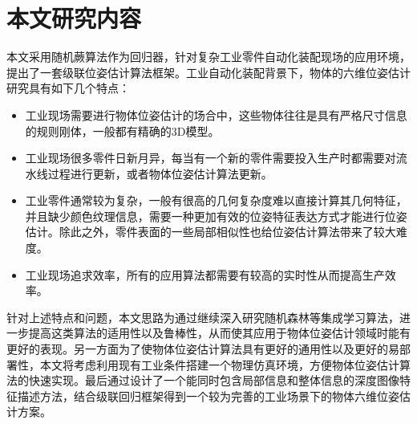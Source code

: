 \section{本文研究内容}

本文采用随机蕨算法作为回归器，针对复杂工业零件自动化装配现场的应用环境，提出了一套级联位姿估计算法框架。工业自动化装配背景下，物体的六维位姿估计研究具有如下几个特点：
\begin{itemize}
\item 工业现场需要进行物体位姿估计的场合中，这些物体往往是具有严格尺寸信息的规则刚体，一般都有精确的3D模型。
\item 工业现场很多零件日新月异，每当有一个新的零件需要投入生产时都需要对流水线过程进行更新，或者物体位姿估计算法更新。
\item 工业零件通常较为复杂，一般有很高的几何复杂度难以直接计算其几何特征，并且缺少颜色纹理信息，需要一种更加有效的位姿特征表达方式才能进行位姿估计。除此之外，零件表面的一些局部相似性也给位姿估计算法带来了较大难度。
\item 工业现场追求效率，所有的应用算法都需要有较高的实时性从而提高生产效率。
\end{itemize}

针对上述特点和问题，本文思路为通过继续深入研究随机森林等集成学习算法，进一步提高这类算法的适用性以及鲁棒性，从而使其应用于物体位姿估计领域时能有更好的表现。另一方面为了使物体位姿估计算法具有更好的通用性以及更好的易部署性，本文将考虑利用现有工业条件搭建一个物理仿真环境，方便物体位姿估计算法的快速实现。最后通过设计了一个能同时包含局部信息和整体信息的深度图像特征描述方法，结合级联回归框架得到一个较为完善的工业场景下的物体六维位姿估计方案。

